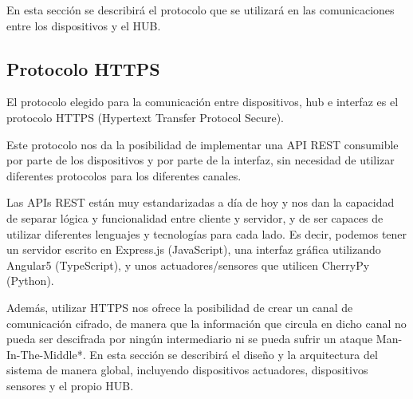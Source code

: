 
En esta sección se describirá el protocolo que se utilizará en las comunicaciones entre los dispositivos y el HUB.
\subsection{Protocolo HTTPS}
El protocolo elegido para la comunicación entre dispositivos, hub e interfaz es el protocolo HTTPS (Hypertext Transfer Protocol Secure).
\par
Este protocolo nos da la posibilidad de implementar una API REST consumible por parte de los dispositivos y por parte de la interfaz,
sin necesidad de utilizar diferentes protocolos para los diferentes canales.
\par
Las APIs REST están muy estandarizadas a día de hoy y nos dan la capacidad de separar lógica y funcionalidad entre cliente y servidor, y de ser capaces
de utilizar diferentes lenguajes y tecnologías para cada lado. Es decir, podemos tener un servidor escrito en Express.js (JavaScript), una interfaz 
gráfica utilizando Angular5 (TypeScript), y unos actuadores/sensores que utilicen CherryPy (Python).
\par
Además, utilizar HTTPS nos ofrece la posibilidad de crear un canal de comunicación cifrado, de manera que la información que circula en dicho 
canal no pueda ser descifrada por ningún intermediario ni se pueda sufrir un ataque Man-In-The-Middle*.
En esta sección se describirá el diseño y la arquitectura del sistema de manera global, incluyendo dispositivos actuadores, 
dispositivos sensores y el propio HUB.
